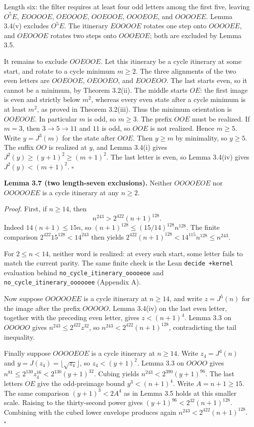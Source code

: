\documentclass[12pt]{article}
\begin{document}
Length six: the filter requires at least four odd letters among the
first five, leaving \(O^5E\), \(EOOOOE\), \(OEOOOE\), \(OOEOOE\),
\(OOOEOE\), and \(OOOOEE\). Lemma 3.4(v) excludes \(O^5E\). The
itinerary \(EOOOOE\) rotates one step onto \(OOOOEE\), and \(OEOOOE\)
rotates two steps onto \(OOOEOE\); both are excluded by Lemma 3.5.

It remains to exclude \(OOEOOE\). Let this itinerary be a cycle
itinerary at some start, and rotate to a cycle minimum \(m\ge 2\). The
three alignments of the two even letters are \(OOEOOE\), \(OEOOEO\), and
\(EOOEOO\). The last starts even, so it cannot be a minimum, by Theorem
3.2(ii). The middle starts \(OE\): the first image is even and strictly
below \(m^2\), whereas every even state after a cycle minimum is at
least \(m^2\), as proved in Theorem 3.2(iii). Thus the minimum
orientation is \(OOEOOE\). In particular \(m\) is odd, so \(m\ge 3\).
The prefix \(OOE\) must be realized. If \(m=3\), then \(3\to 5\to 11\)
and \(11\) is odd, so \(OOE\) is not realized. Hence \(m\ge 5\). Write
\(y=J^3(m)\) for the state after \(OOE\). Then \(y\ge m\) by minimality,
so \(y\ge 5\). The suffix \(OO\) is realized at \(y\), and Lemma 3.4(i)
gives \(J^2(y)\ge(y+1)^2\ge(m+1)^2\). The last letter is even, so Lemma
3.4(iv) gives \(J^2(y)<(m+1)^2\). \(\square\)

\textbf{Lemma 3.7 (two length-seven exclusions).} Neither \(OOOOEOE\)
nor \(OOOOOEE\) is a cycle itinerary at any \(n\ge 2\).

\emph{Proof.} First, if \(n\ge 14\), then \[
n^{243}>2^{422}(n+1)^{128}.
\] Indeed \(14(n+1)\le 15n\), so \((n+1)^{128}\le(15/14)^{128}n^{128}\).
The finite comparison \(2^{422}15^{128}<14^{243}\) then yields
\(2^{422}(n+1)^{128}<14^{115}n^{128}\le n^{243}\).

For \(2\le n<14\), neither word is realized: at every such start, some
letter fails to match the current parity. The same finite check is the
Lean \texttt{decide\ +kernel} evaluation behind
\texttt{\nolinkurl{no_cycle_itinerary_ooooeoe}} and
\texttt{\nolinkurl{no_cycle_itinerary_oooooee}} (Appendix A).

Now suppose \(OOOOOEE\) is a cycle itinerary at \(n\ge 14\), and write
\(z=J^5(n)\) for the image after the prefix \(OOOOO\). Lemma 3.4(iv) on
the last even letter, together with the preceding even letter, gives
\(z<(n+1)^4\). Lemma 3.3 on \(OOOOO\) gives
\(n^{243}\le 2^{422}z^{32}\), so \(n^{243}<2^{422}(n+1)^{128}\),
contradicting the tail inequality.

Finally suppose \(OOOOEOE\) is a cycle itinerary at \(n\ge 14\). Write
\(z_4=J^4(n)\) and \(y=J(z_4)=\lfloor\sqrt{z_4}\rfloor\), so
\(z_4<(y+1)^2\). Lemma 3.3 on \(OOOO\) gives
\(n^{81}\le 2^{130}z_4^{16}<2^{130}(y+1)^{32}\). Cubing yields
\(n^{243}<2^{390}(y+1)^{96}\). The last letters \(OE\) give the
odd-preimage bound \(y^3<(n+1)^4\). Write \(A=n+1\ge 15\). The same
comparison \((y+1)^3<2A^4\) as in Lemma 3.5 holds at this smaller scale.
Raising to the thirty-second power gives
\((y+1)^{96}<2^{32}(n+1)^{128}\). Combining with the cubed lower
envelope produces again \(n^{243}<2^{422}(n+1)^{128}\). \(\square\)
\end{document}
